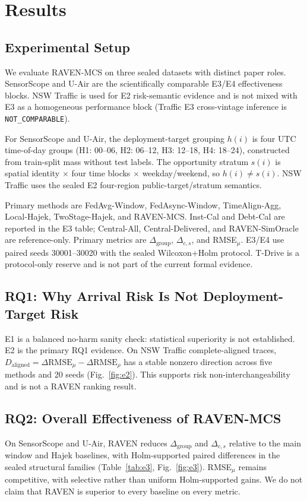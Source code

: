\section{Results}
\subsection{Experimental Setup}
We evaluate RAVEN-MCS on three sealed datasets with distinct paper roles. SensorScope and U-Air are the scientifically comparable E3/E4 effectiveness blocks. NSW Traffic is used for E2 risk-semantic evidence and is not mixed with E3 as a homogeneous performance block (Traffic E3 cross-vintage inference is \texttt{NOT\_COMPARABLE}).

For SensorScope and U-Air, the deployment-target grouping \(h(i)\) is four UTC time-of-day groups (H1: 00--06, H2: 06--12, H3: 12--18, H4: 18--24), constructed from train-split mass without test labels. The opportunity stratum \(s(i)\) is spatial identity \(\times\) four time blocks \(\times\) weekday/weekend, so \(h(i)\neq s(i)\). NSW Traffic uses the sealed E2 four-region public-target/stratum semantics.

Primary methods are FedAvg-Window, FedAsync-Window, TimeAlign-Agg, Local-Hajek, TwoStage-Hajek, and RAVEN-MCS. Inst-Cal and Debt-Cal are reported in the E3 table; Central-All, Central-Delivered, and RAVEN-SimOracle are reference-only. Primary metrics are \(\Delta_{\mathrm{group}}\), \(\Delta_{c,s}\), and RMSE\(_\mu\). E3/E4 use paired seeds 30001--30020 with the sealed Wilcoxon+Holm protocol. T-Drive is a protocol-only reserve and is not part of the current formal evidence.

\subsection{RQ1: Why Arrival Risk Is Not Deployment-Target Risk}
E1 is a balanced no-harm sanity check: statistical superiority is not established. E2 is the primary RQ1 evidence. On NSW Traffic complete-aligned traces, \(D_{\mathrm{aligned}}=\Delta\mathrm{RMSE}_\mu-\Delta\mathrm{RMSE}_\rho\) has a stable nonzero direction across five methods and 20 seeds (Fig.~\ref{fig:e2}). This supports risk non-interchangeability and is not a RAVEN ranking result.

\subsection{RQ2: Overall Effectiveness of RAVEN-MCS}
On SensorScope and U-Air, RAVEN reduces \(\Delta_{\mathrm{group}}\) and \(\Delta_{c,s}\) relative to the main window and Hajek baselines, with Holm-supported paired differences in the sealed structural families (Table~\ref{tab:e3}, Fig.~\ref{fig:e3}). RMSE\(_\mu\) remains competitive, with selective rather than uniform Holm-supported gains. We do not claim that RAVEN is superior to every baseline on every metric.

